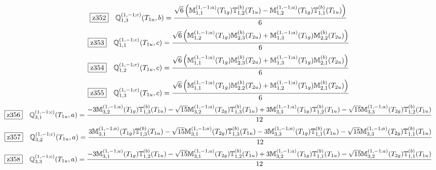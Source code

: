 \documentclass[fleqn,10pt,landscape]{jsarticle}
\begin{document}
\begin{dmath*}
\hspace*{3mm}\fbox{z352}\quad \mathbb{Q}_{1,3}^{(1,-1;c)}(T_{1u},b)=\frac{\sqrt{6} \left(\mathbb{M}_{1,1}^{(1,-1;a)}(T_{1g}) \mathbb{T}_{1,2}^{(b)}(T_{1u}) - \mathbb{M}_{1,2}^{(1,-1;a)}(T_{1g}) \mathbb{T}_{1,1}^{(b)}(T_{1u})\right)}{6}
\end{dmath*}
\begin{dmath*}
\hspace*{3mm}\fbox{z353}\quad \mathbb{Q}_{1,1}^{(1,-1;c)}(T_{1u},c)=\frac{\sqrt{6} \left(\mathbb{M}_{1,2}^{(1,-1;a)}(T_{1g}) \mathbb{M}_{2,3}^{(b)}(T_{2u}) + \mathbb{M}_{1,3}^{(1,-1;a)}(T_{1g}) \mathbb{M}_{2,2}^{(b)}(T_{2u})\right)}{6}
\end{dmath*}
\begin{dmath*}
\hspace*{3mm}\fbox{z354}\quad \mathbb{Q}_{1,2}^{(1,-1;c)}(T_{1u},c)=\frac{\sqrt{6} \left(\mathbb{M}_{1,1}^{(1,-1;a)}(T_{1g}) \mathbb{M}_{2,3}^{(b)}(T_{2u}) + \mathbb{M}_{1,3}^{(1,-1;a)}(T_{1g}) \mathbb{M}_{2,1}^{(b)}(T_{2u})\right)}{6}
\end{dmath*}
\begin{dmath*}
\hspace*{3mm}\fbox{z355}\quad \mathbb{Q}_{1,3}^{(1,-1;c)}(T_{1u},c)=\frac{\sqrt{6} \left(\mathbb{M}_{1,1}^{(1,-1;a)}(T_{1g}) \mathbb{M}_{2,2}^{(b)}(T_{2u}) + \mathbb{M}_{1,2}^{(1,-1;a)}(T_{1g}) \mathbb{M}_{2,1}^{(b)}(T_{2u})\right)}{6}
\end{dmath*}
\begin{dmath*}
\hspace*{3mm}\fbox{z356}\quad \mathbb{Q}_{3,1}^{(1,-1;c)}(T_{1u},a)=\frac{- 3 \mathbb{M}_{3,2}^{(1,-1;a)}(T_{1g}) \mathbb{T}_{1,3}^{(b)}(T_{1u}) - \sqrt{15} \mathbb{M}_{3,2}^{(1,-1;a)}(T_{2g}) \mathbb{T}_{1,3}^{(b)}(T_{1u}) + 3 \mathbb{M}_{3,3}^{(1,-1;a)}(T_{1g}) \mathbb{T}_{1,2}^{(b)}(T_{1u}) - \sqrt{15} \mathbb{M}_{3,3}^{(1,-1;a)}(T_{2g}) \mathbb{T}_{1,2}^{(b)}(T_{1u})}{12}
\end{dmath*}
\begin{dmath*}
\hspace*{3mm}\fbox{z357}\quad \mathbb{Q}_{3,2}^{(1,-1;c)}(T_{1u},a)=\frac{3 \mathbb{M}_{3,1}^{(1,-1;a)}(T_{1g}) \mathbb{T}_{1,3}^{(b)}(T_{1u}) - \sqrt{15} \mathbb{M}_{3,1}^{(1,-1;a)}(T_{2g}) \mathbb{T}_{1,3}^{(b)}(T_{1u}) - 3 \mathbb{M}_{3,3}^{(1,-1;a)}(T_{1g}) \mathbb{T}_{1,1}^{(b)}(T_{1u}) - \sqrt{15} \mathbb{M}_{3,3}^{(1,-1;a)}(T_{2g}) \mathbb{T}_{1,1}^{(b)}(T_{1u})}{12}
\end{dmath*}
\begin{dmath*}
\hspace*{3mm}\fbox{z358}\quad \mathbb{Q}_{3,3}^{(1,-1;c)}(T_{1u},a)=\frac{- 3 \mathbb{M}_{3,1}^{(1,-1;a)}(T_{1g}) \mathbb{T}_{1,2}^{(b)}(T_{1u}) - \sqrt{15} \mathbb{M}_{3,1}^{(1,-1;a)}(T_{2g}) \mathbb{T}_{1,2}^{(b)}(T_{1u}) + 3 \mathbb{M}_{3,2}^{(1,-1;a)}(T_{1g}) \mathbb{T}_{1,1}^{(b)}(T_{1u}) - \sqrt{15} \mathbb{M}_{3,2}^{(1,-1;a)}(T_{2g}) \mathbb{T}_{1,1}^{(b)}(T_{1u})}{12}
\end{dmath*}
\end{document}
